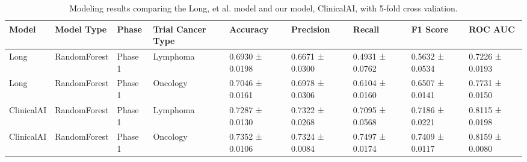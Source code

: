 \begin{table}
\caption{Modeling results comparing the Long, et al. model and our model, ClinicalAI, with 5-fold cross valiation.}
\label{tab:model_performance}
\begin{tabular}{lllllllll}
\toprule
Model & Model Type & Phase & Trial Cancer Type & Accuracy & Precision & Recall & F1 Score & ROC AUC \\
\midrule
Long & RandomForest & Phase 1 & Lymphoma & 0.6930 ± 0.0198 & 0.6671 ± 0.0300 & 0.4931 ± 0.0762 & 0.5632 ± 0.0534 & 0.7226 ± 0.0193 \\
Long & RandomForest & Phase 1 & Oncology & 0.7046 ± 0.0161 & 0.6978 ± 0.0306 & 0.6104 ± 0.0160 & 0.6507 ± 0.0141 & 0.7731 ± 0.0150 \\
ClinicalAI & RandomForest & Phase 1 & Lymphoma & 0.7287 ± 0.0130 & 0.7322 ± 0.0268 & 0.7095 ± 0.0568 & 0.7186 ± 0.0221 & 0.8115 ± 0.0198 \\
ClinicalAI & RandomForest & Phase 1 & Oncology & 0.7352 ± 0.0106 & 0.7324 ± 0.0084 & 0.7497 ± 0.0174 & 0.7409 ± 0.0117 & 0.8159 ± 0.0080 \\
\bottomrule
\end{tabular}
\end{table}
